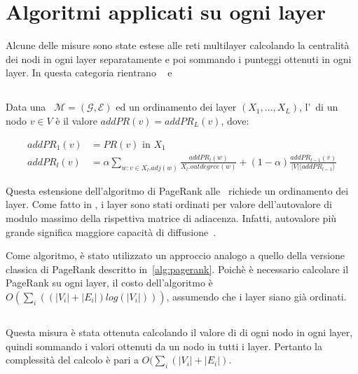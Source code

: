 \section{Algoritmi applicati su ogni layer}
Alcune delle misure sono state estese alle reti multilayer calcolando la centralità
dei nodi in ogni layer separatamente e poi sommando i punteggi ottenuti in ogni layer.
In questa categoria rientrano \addPageRank~\cite{halu:addpagerank} 
e \sumCore~\cite{basaras:infspmul}

\subsection{\addPageRank}
\begin{definizione}[\addPageRank]
    Data una \muln\ $\mathcal{M}=(\mathcal{G}, \mathcal{E})$ 
    ed un ordinamento dei layer $(X_1, \dots, X_{L})$, l'\addPageRank\
    di un nodo $v \in V$ è il valore 
    $addPR(v) = addPR_L(v)$, dove:

    \begin{equation}
        \begin{split}
addPR_1(v)&= PR(v) \text{ in } X_1 \\
addPR_l(v)&= \alpha \sum_{w : v \in X_l.adj(w)} 
            \frac{addPR_l(w)}{X_l.outdegree(w)} + 
            (1-\alpha)\frac{addPR_{l-1}(v)}{|V| \langle addPR_{l-1} \rangle}
        \end{split}
    \end{equation}

\end{definizione}

Questa estensione dell'algoritmo di PageRank alle \muln\ richiede un ordinamento
dei layer. Come fatto in \cite{basaras:infspmul}, i layer sono stati ordinati per valore
dell'autovalore di modulo massimo della rispettiva matrice di adiacenza. Infatti, 
autovalore più grande significa maggiore capacità di diffusione~\cite{wang:eigenv}.

Come algoritmo, è stato utilizzato un approccio analogo a quello della versione classica di 
PageRank descritto in~\vref{alg:pagerank}.
Poichè è necessario calcolare il PageRank su ogni layer, il costo dell'algoritmo è 
$O(\sum_{i}((|V_i| + |E_i|)log(|V_i|)))$, assumendo che i layer siano già ordinati.

\subsection{\sumCore}
Questa misura è stata ottenuta calcolando il valore di \kcore di ogni nodo in 
ogni layer, quindi sommando i valori ottenuti da un nodo in tutti i layer.
Pertanto la complessità del calcolo è pari a $O(\sum_{i}(|V_i| + |E_i|)$.

